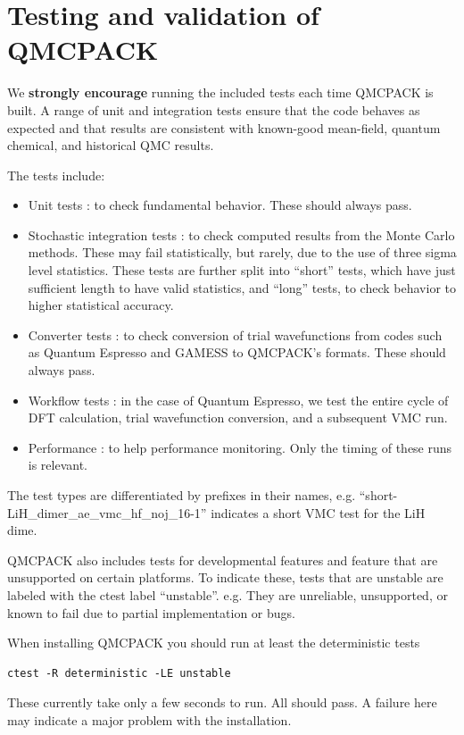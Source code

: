 \section{Testing and validation of QMCPACK}
\label{sec:testing}
We \textbf{strongly encourage} running the included tests each time
QMCPACK is built. A range of unit and integration tests ensure that
the code behaves as expected and that results are consistent with
known-good mean-field, quantum chemical, and historical QMC results.

The tests include:
\begin{itemize}
\item Unit tests : to check fundamental behavior. These should always pass.
\item Stochastic integration tests : to check computed results from
  the Monte Carlo methods. These may fail statistically, but rarely,
  due to the use of three sigma level statistics. These tests are
  further split into ``short'' tests, which have just sufficient
  length to have valid statistics, and ``long'' tests, to check
  behavior to higher statistical accuracy.
\item Converter tests : to check conversion of trial wavefunctions
  from codes such as Quantum Espresso and GAMESS to QMCPACK's
  formats. These should always pass.
\item Workflow tests : in the case of Quantum Espresso, we test the
  entire cycle of DFT calculation, trial wavefunction conversion, and
  a subsequent VMC run.  
\item Performance : to help performance monitoring. Only the timing of
  these runs is relevant.  
\end{itemize}


The test types are differentiated by prefixes in their names,
e.g. ``short-LiH\_dimer\_ae\_vmc\_hf\_noj\_16-1'' indicates a short VMC test
for the LiH dime. 

QMCPACK also includes tests for developmental features and feature
that are unsupported on certain platforms. To indicate these, tests
that are unstable are labeled with the ctest label
``unstable''. e.g. They are unreliable, unsupported, or known to fail
due to partial implementation or bugs.

When installing QMCPACK you should run at least the deterministic
tests
\begin{verbatim}
ctest -R deterministic -LE unstable
\end{verbatim}
These currently take only a few seconds to run. All should pass. A
failure here may indicate a major problem with the installation.

